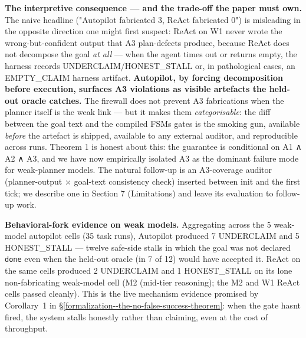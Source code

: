 \textbf{The interpretive consequence --- and the trade-off the paper must own.} The naive headline
("Autopilot fabricated 3, ReAct fabricated 0") is misleading in the opposite direction one might
first suspect: ReAct on W1 never wrote the wrong-but-confident output that A3 plan-defects
produce, because ReAct does not decompose the goal \emph{at all} --- when the agent times out or returns
empty, the harness records UNDERCLAIM/HONEST\_STALL or, in pathological cases, an EMPTY\_CLAIM
harness artifact. \textbf{Autopilot, by forcing decomposition before execution, surfaces A3 violations
as visible artefacts the held-out oracle catches.} The firewall does not prevent A3 fabrications
when the planner itself is the weak link --- but it makes them \emph{categorisable}: the diff between
the goal text and the compiled FSM\textquotesingle s gates is the smoking gun, available \emph{before} the artefact is
shipped, available to any external auditor, and reproducible across runs. Theorem 1 is honest
about this: the guarantee is conditional on A1 ∧ A2 ∧ A3, and we have now empirically isolated A3
as the dominant failure mode for weak-planner models. The natural follow-up is an A3-coverage
auditor (planner-output × goal-text consistency check) inserted between init and the first tick;
we describe one in Section 7 (Limitations) and leave its evaluation to follow-up work.

\textbf{Behavioral-fork evidence on weak models.} Aggregating across the 5 weak-model autopilot cells
(35 task runs), Autopilot produced 7 UNDERCLAIM and 5 HONEST\_STALL --- twelve safe-side stalls in
which the goal was not declared \texttt{done} even when the held-out oracle (in 7 of 12) would have
accepted it. ReAct on the same cells produced 2 UNDERCLAIM and 1 HONEST\_STALL on its lone
non-fabricating weak-model cell (M2 (mid-tier reasoning); the M2 and W1 ReAct cells passed cleanly).
This is the live mechanism evidence promised by Corollary~1 in \S\ref{formalization--the-no-false-success-theorem}: when the gate hasn\textquotesingle t fired, the
system stalls honestly rather than claiming, even at the cost of throughput.

